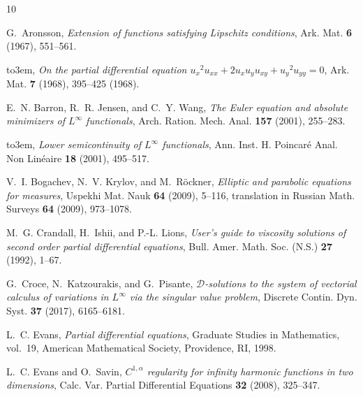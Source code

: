 \documentclass[a4paper]{article}
\theoremstyle{remark}
\begin{document}
\def\cprime{$'$}
\providecommand{\bysame}{\leavevmode\hbox to3em{\hrulefill}\thinspace}
\providecommand{\MR}{\relax\ifhmode\unskip\space\fi MR }
\providecommand{\MRhref}[2]{%
  \href{http://www.ams.org/mathscinet-getitem?mr=#1}{#2}
}
\providecommand{\href}[2]{#2}
\begin{thebibliography}{10}

G.~Aronsson, \emph{Extension of functions satisfying {L}ipschitz conditions},
  Ark. Mat. \textbf{6} (1967), 551--561.

\bysame, \emph{On the partial differential equation
  {$u_{x}{}^{2}\!u_{xx}+2u_{x}u_{y}u_{xy}+u_{y}{}^{2}\!u_{yy}=0$}}, Ark. Mat.
  \textbf{7} (1968), 395--425 (1968).

E.~N. Barron, R.~R. Jensen, and C.~Y. Wang, \emph{The {E}uler equation and
  absolute minimizers of {$L^\infty$} functionals}, Arch. Ration. Mech. Anal.
  \textbf{157} (2001), 255--283.

\bysame, \emph{Lower semicontinuity of {$L^\infty$} functionals}, Ann. Inst. H.
  Poincar\'{e} Anal. Non Lin\'{e}aire \textbf{18} (2001), 495--517.

V.~I. Bogachev, N.~V. Krylov, and M.~R\"{o}ckner, \emph{Elliptic and parabolic
  equations for measures}, Uspekhi Mat. Nauk \textbf{64} (2009), 5--116,
  translation in Russian Math. Surveys \textbf{64} (2009), 973--1078.

M.~G. Crandall, H.~Ishii, and P.-L. Lions, \emph{User's guide to viscosity
  solutions of second order partial differential equations}, Bull. Amer. Math.
  Soc. (N.S.) \textbf{27} (1992), 1--67.

G.~Croce, N.~Katzourakis, and G.~Pisante, \emph{{$\mathcal{D}$}-solutions to
  the system of vectorial calculus of variations in {$L^\infty$} via the
  singular value problem}, Discrete Contin. Dyn. Syst. \textbf{37} (2017),
  6165--6181.

L.~C. Evans, \emph{Partial differential equations}, Graduate Studies in
  Mathematics, vol.~19, American Mathematical Society, Providence, RI, 1998.

L.~C. Evans and O.~Savin, \emph{{$C^{1,\alpha}$} regularity for infinity
  harmonic functions in two dimensions}, Calc. Var. Partial Differential
  Equations \textbf{32} (2008), 325--347.


\end{thebibliography}
\end{document}
